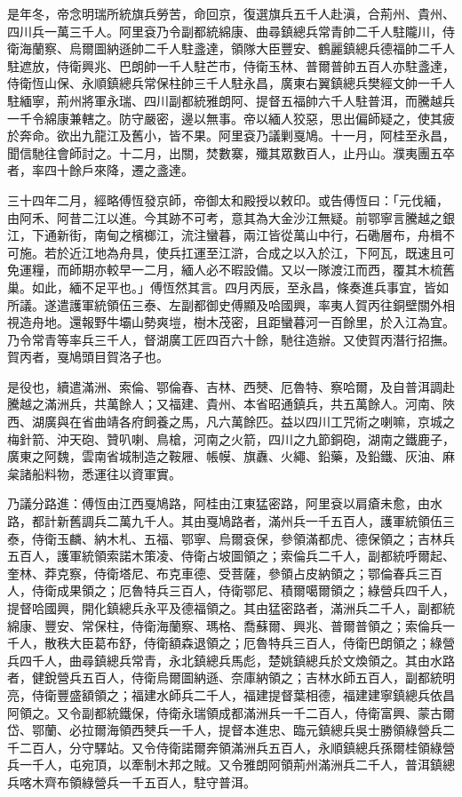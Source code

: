 \begin{pinyinscope}
是年冬，帝念明瑞所統旗兵勞苦，命回京，復選旗兵五千人赴滇，合荊州、貴州、四川兵一萬三千人。阿里袞乃令副都統綿康、曲尋鎮總兵常青帥二千人駐隴川，侍衛海蘭察、烏爾圖納遜帥二千人駐盞達，領隊大臣豐安、鶴麗鎮總兵德福帥二千人駐遮放，侍衛興兆、巴朗帥一千人駐芒市，侍衛玉林、普爾普帥五百人亦駐盞達，侍衛恆山保、永順鎮總兵常保柱帥三千人駐永昌，廣東右翼鎮總兵樊經文帥一千人駐緬寧，荊州將軍永瑞、四川副都統雅朗阿、提督五福帥六千人駐普洱，而騰越兵一千令綿康兼轄之。防守嚴密，邊以無事。帝以緬人狡惡，思出偏師疑之，使其疲於奔命。欲出九龍江及舊小，皆不果。阿里袞乃議剿戛鳩。十一月，阿桂至永昌，聞信馳往會師討之。十二月，出關，焚數寨，殲其眾數百人，止丹山。濮夷團五卒者，率四十餘戶來降，遷之盞達。

三十四年二月，經略傅恆發京師，帝御太和殿授以敕印。或告傅恆曰：「元伐緬，由阿禾、阿昔二江以進。今其跡不可考，意其為大金沙江無疑。前鄂寧言騰越之銀江，下通新街，南甸之檳榔江，流注蠻暮，兩江皆從萬山中行，石磡層布，舟楫不可施。若於近江地為舟具，使兵扛運至江滸，合成之以入於江，下阿瓦，既速且可免運糧，而師期亦較早一二月，緬人必不暇設備。又以一隊渡江而西，覆其木梳舊巢。如此，緬不足平也。」傅恆然其言。四月丙辰，至永昌，條奏進兵事宜，皆如所議。遂遣護軍統領伍三泰、左副都御史傅顯及哈國興，率夷人賀丙往銅壁關外相視造舟地。還報野牛壩山勢爽塏，樹木茂密，且距蠻暮河一百餘里，於入江為宜。乃令常青等率兵三千人，督湖廣工匠四百六十餘，馳往造辦。又使賀丙潛行招撫。賀丙者，戛鳩頭目賀洛子也。

是役也，續遣滿洲、索倫、鄂倫春、吉林、西僰、厄魯特、察哈爾，及自普洱調赴騰越之滿洲兵，共萬餘人；又福建、貴州、本省昭通鎮兵，共五萬餘人。河南、陜西、湖廣與在省曲靖各府飼養之馬，凡六萬餘匹。益以四川工咒術之喇嘛，京城之梅針箭、沖天砲、贊叭喇、鳥槍，河南之火箭，四川之九節銅砲，湖南之鐵鹿子，廣東之阿魏，雲南省城制造之鞍屜、帳幙、旗纛、火繩、鉛藥，及鉛鐵、灰油、麻枲諸船料物，悉運往以資軍實。

乃議分路進：傅恆由江西戛鳩路，阿桂由江東猛密路，阿里袞以肩瘡未愈，由水路，都計新舊調兵二萬九千人。其由戛鳩路者，滿州兵一千五百人，護軍統領伍三泰，侍衛玉麟、納木札、五福、鄂寧、烏爾袞保，參領滿都虎、德保領之；吉林兵五百人，護軍統領索諾木策凌、侍衛占坡圖領之；索倫兵二千人，副都統呼爾起、奎林、莽克察，侍衛塔尼、布克車德、受菩薩，參領占皮納領之；鄂倫春兵三百人，侍衛成果領之；厄魯特兵三百人，侍衛鄂尼、積爾噶爾領之；綠營兵四千人，提督哈國興，開化鎮總兵永平及德福領之。其由猛密路者，滿洲兵二千人，副都統綿康、豐安、常保柱，侍衛海蘭察、瑪格、喬蘇爾、興兆、普爾普領之；索倫兵一千人，散秩大臣葛布舒，侍衛額森退領之；厄魯特兵三百人，侍衛巴朗領之；綠營兵四千人，曲尋鎮總兵常青，永北鎮總兵馬彪，楚姚鎮總兵於文煥領之。其由水路者，健銳營兵五百人，侍衛烏爾圖納遜、奈庫納領之；吉林水師五百人，副都統明亮，侍衛豐盛額領之；福建水師兵二千人，福建提督葉相德，福建建寧鎮總兵依昌阿領之。又令副都統鐵保，侍衛永瑞領成都滿洲兵一千二百人，侍衛富興、蒙古爾岱、鄂蘭、必拉爾海領西僰兵一千人，提督本進忠、臨元鎮總兵吳士勝領綠營兵二千二百人，分守驛站。又令侍衛諾爾奔領滿洲兵五百人，永順鎮總兵孫爾桂領綠營兵一千人，屯宛頂，以牽制木邦之賊。又令雅朗阿領荊州滿洲兵二千人，普洱鎮總兵喀木齊布領綠營兵一千五百人，駐守普洱。


\end{pinyinscope}
